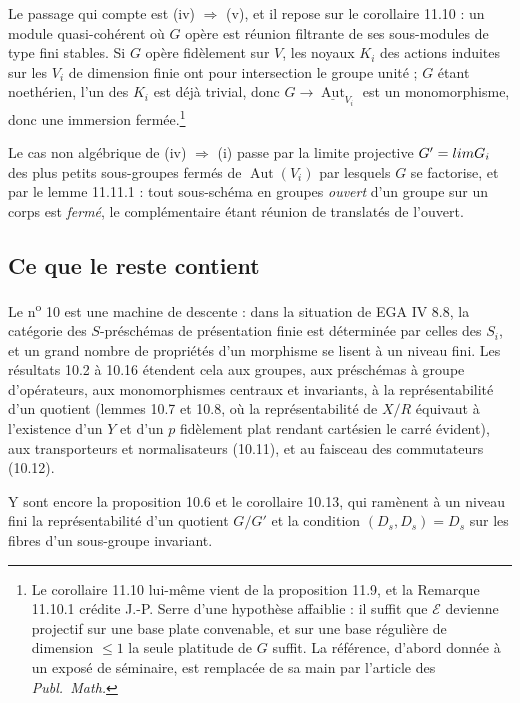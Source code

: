 \documentclass[11pt,a4paper]{article}
\begin{document}
Le passage qui compte est (iv) $\Rightarrow$ (v), et il repose sur le
corollaire 11.10 : un module quasi-cohérent où $G$ opère est réunion filtrante
de ses sous-modules de type fini stables. Si $G$ opère fidèlement sur $V$, les
noyaux $K_{i}$ des actions induites sur les $V_{i}$ de dimension finie ont pour
intersection le groupe unité ; $G$ étant noethérien, l'un des $K_{i}$ est déjà
trivial, donc $G \to \underline{\operatorname{Aut}}_{V_{i}}$ est un
monomorphisme, donc une immersion fermée.\footnote{Le corollaire 11.10 lui-même
vient de la proposition 11.9, et la Remarque 11.10.1 crédite J.-P. Serre d'une
hypothèse affaiblie : il suffit que $\mathcal{E}$ devienne projectif sur une
base plate convenable, et sur une base régulière de dimension $\leqslant 1$ la
seule platitude de $G$ suffit. La référence, d'abord donnée à un exposé de
séminaire, est remplacée de sa main par l'article des \emph{Publ.\ Math.}}

Le cas non algébrique de (iv) $\Rightarrow$ (i) passe par la limite projective
$G' = \varprojlim G_{i}$ des plus petits sous-groupes fermés de
$\operatorname{Aut}(V_{i})$ par lesquels $G$ se factorise, et par le lemme
11.11.1 : tout sous-schéma en groupes \emph{ouvert} d'un groupe sur un corps
est \emph{fermé}, le complémentaire étant réunion de translatés de l'ouvert.

\subsection*{Ce que le reste contient}

Le n\textsuperscript{o} 10 est une machine de descente : dans la situation de
EGA IV 8.8, la catégorie des $S$-préschémas de présentation finie est déterminée
par celles des $S_{i}$, et un grand nombre de propriétés d'un morphisme se
lisent à un niveau fini. Les résultats 10.2 à 10.16 étendent cela aux groupes,
aux préschémas à groupe d'opérateurs, aux monomorphismes centraux et
invariants, à la représentabilité d'un quotient (lemmes 10.7 et 10.8, où la
représentabilité de $X/R$ équivaut à l'existence d'un $Y$ et d'un $p$
fidèlement plat rendant cartésien le carré évident), aux transporteurs et
normalisateurs (10.11), et au faisceau des commutateurs (10.12).

Y sont encore la proposition 10.6 et le corollaire 10.13, qui ramènent à un
niveau fini la représentabilité d'un quotient $G/G'$ et la condition
$(D_{s}, D_{s}) = D_{s}$ sur les fibres d'un sous-groupe invariant.
\end{document}
